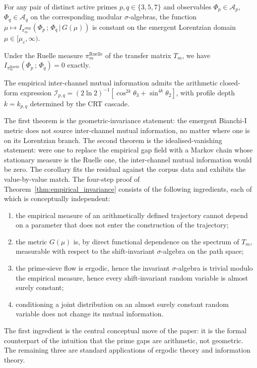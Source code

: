 \begin{description}[itemsep=4pt,leftmargin=*]
  \item[\textbf{Theorem~\ref{thm:empirical_invariance} (empirical form).}]
  For any pair of distinct active primes $p, q \in \{3, 5, 7\}$
  and observables $\Phi_p \in \mathcal{A}_p$, $\Phi_q \in
  \mathcal{A}_q$ on the corresponding modular $\sigma$-algebras,
  the function
  $\mu \mapsto I_{\pi_m^{\mathrm{emp}}}(\Phi_p\,;\,\Phi_q\,|\,
  G(\mu))$ is constant on the emergent Lorentzian domain
  $\mu \in [\mu_c, \infty)$.

  \item[\textbf{Theorem~\ref{thm:ruelle_zero} (idealised form).}]
  Under the Ruelle measure $\pi_m^{\mathrm{Ruelle}}$ of the
  transfer matrix $T_m$, we have
  $I_{\pi_m^{\mathrm{Ruelle}}}(\Phi_p\,;\,\Phi_q) = 0$ exactly.

  \item[\textbf{Corollary~\ref{cor:closed_form} (closed form).}]
  The empirical inter-channel mutual information admits the
  arithmetic closed-form expression
  $\mathcal{I}_{p,q} = (2 \ln 2)^{-1}[\cos^{2k}\theta_3 +
  \sin^{4k}\theta_2]$, with profile depth $k = k_{p,q}$ determined
  by the CRT cascade.
\end{description}

The first theorem is the geometric-invariance statement: the
emergent Bianchi-I metric does not source inter-channel mutual
information, no matter where one is on its Lorentzian branch. The
second theorem is the idealised-vanishing statement: were one to
replace the empirical gap field with a Markov chain whose stationary
measure is the Ruelle one, the inter-channel mutual information
would be zero. The corollary fits the residual against the corpus
data and exhibits the value-by-value match. The four-step proof of
Theorem~\ref{thm:empirical_invariance} consists of the following
ingredients, each of which is conceptually independent:
\begin{enumerate}[label=(\roman*),itemsep=2pt]
  \item the empirical measure of an arithmetically defined trajectory
    cannot depend on a parameter that does not enter the
    construction of the trajectory;
  \item the metric $G(\mu)$ is, by direct functional dependence on
    the spectrum of $T_m$, measurable with respect to the
    shift-invariant $\sigma$-algebra on the path space;
  \item the prime-sieve flow is ergodic, hence the invariant
    $\sigma$-algebra is trivial modulo the empirical measure, hence
    every shift-invariant random variable is almost surely
    constant;
  \item conditioning a joint distribution on an almost surely
    constant random variable does not change its mutual information.
\end{enumerate}
The first ingredient is the central conceptual move of the paper:
it is the formal counterpart of the intuition that the prime gaps
are arithmetic, not geometric. The remaining three are standard
applications of ergodic theory and information theory.

